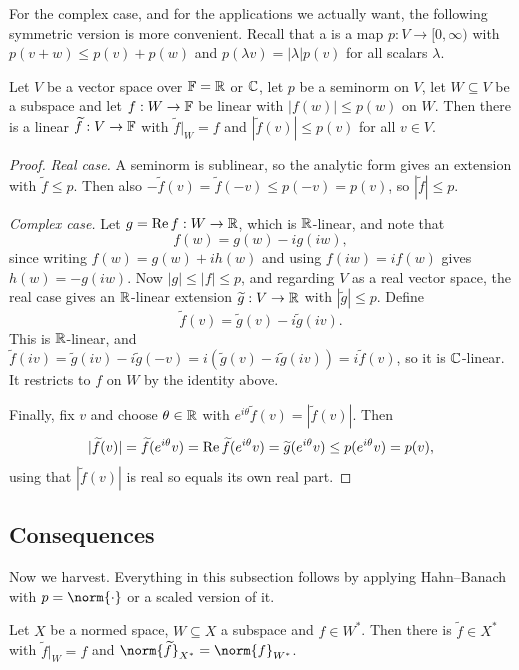 \documentclass[a4paper]{scrartcl}
\newcommand{\wt}{\widetilde}
\begin{document}
For the complex case, and for the applications we actually want, the following symmetric version is more convenient. Recall that a  is a map $p : V \to [0,\infty)$ with $p(v+w) \leq p(v) + p(w)$ and $p(\lambda v) = |\lambda| p(v)$ for all scalars $\lambda$.

\begin{theorem}
	Let $V$ be a vector space over $\mathbb{F} = \mathbb{R}$ or $\mathbb{C}$, let $p$ be a seminorm on $V$, let $W \subseteq V$ be a subspace and let $f : W \to \mathbb{F}$ be linear with $|f(w)| \leq p(w)$ on $W$. Then there is a linear $\wt f : V \to \F$ with $\wt f|_W = f$ and $|\wt f(v)| \leq p(v)$ for all $v \in V$.
\end{theorem}

\begin{proof}
	\emph{Real case.} A seminorm is sublinear, so the analytic form gives an extension with $\wt f \leq p$. Then also $-\wt f(v) = \wt f(-v) \leq p(-v) = p(v)$, so $|\wt f| \leq p$.

	\emph{Complex case.} Let $g = \operatorname{Re} f : W \to \mathbb{R}$, which is $\mathbb{R}$-linear, and note that
	$$f(w) = g(w) - i g(iw),$$
	since writing $f(w) = g(w) + ih(w)$ and using $f(iw) = if(w)$ gives $h(w) = -g(iw)$. Now $|g| \leq |f| \leq p$, and regarding $V$ as a real vector space, the real case gives an $\mathbb{R}$-linear extension $\wt g : V \to \R$ with $|\wt g| \leq p$. Define
	$$\wt f(v) = \wt g(v) - i \wt g(iv).$$
	This is $\mathbb{R}$-linear, and $\wt f(iv) = \wt g(iv) - i\wt g(-v) = i(\wt g(v) - i \wt g(iv)) = i \wt f(v)$, so it is $\mathbb{C}$-linear. It restricts to $f$ on $W$ by the identity above.

	Finally, fix $v$ and choose $\theta \in \mathbb{R}$ with $e^{i\theta} \wt f(v) = |\wt f(v)|$. Then
	$$|\wt f(v)| = \wt f(e^{i\theta} v) = \re \wt f(e^{i\theta}v) = \wt g(e^{i\theta} v) \leq p(e^{i\theta}v) = p(v),$$
	using that $|\wt f(v)|$ is real so equals its own real part.
\end{proof}

\subsection{Consequences}

Now we harvest. Everything in this subsection follows by applying Hahn--Banach with $p = \norm{\cdot}$ or a scaled version of it.

\begin{corollary}
	Let $X$ be a normed space, $W \subseteq X$ a subspace and $f \in W^*$. Then there is $\wt f \in X^*$ with $\wt f|_W = f$ and $\norm{\wt f}_{X^*} = \norm{f}_{W^*}$.
\end{corollary}
\end{document}
